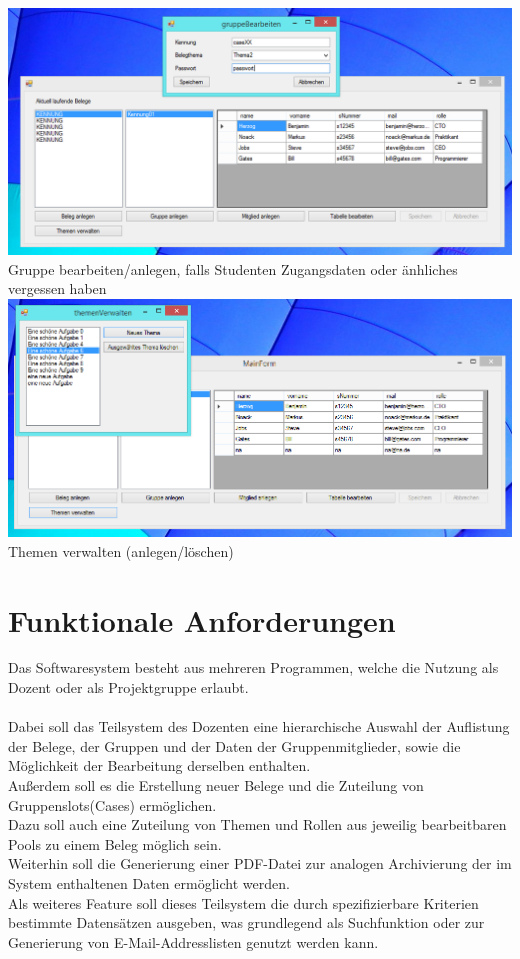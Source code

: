 \documentclass{article}
\begin{document}
\begin{center}
    \includegraphics[scale=0.6]{bilder/doz4.PNG}\\
    Gruppe bearbeiten/anlegen, falls Studenten Zugangsdaten oder änhliches vergessen haben \\
    
    \includegraphics[scale=0.6]{bilder/doz5.PNG}\\
    Themen verwalten (anlegen/löschen) \\
\end{center}
\newpage

\part{Funktionale Anforderungen}

Das Softwaresystem besteht aus mehreren Programmen, welche die Nutzung als Dozent oder als Projektgruppe erlaubt.\\\\

Dabei soll das Teilsystem des Dozenten eine hierarchische Auswahl der Auflistung der Belege, der Gruppen und der Daten der Gruppenmitglieder, sowie die Möglichkeit der Bearbeitung derselben enthalten.\\
Außerdem soll es die Erstellung neuer Belege und die Zuteilung von Gruppenslots(Cases) ermöglichen.\\
Dazu soll auch eine Zuteilung von Themen und Rollen aus jeweilig bearbeitbaren Pools zu einem Beleg möglich sein.\\
Weiterhin soll die Generierung einer PDF-Datei zur analogen Archivierung der im System enthaltenen Daten ermöglicht werden.\\
Als weiteres Feature soll dieses Teilsystem die durch spezifizierbare Kriterien bestimmte Datensätzen ausgeben, was grundlegend als Suchfunktion oder zur Generierung von E-Mail-Addresslisten genutzt werden kann.\\\\
\end{document}
